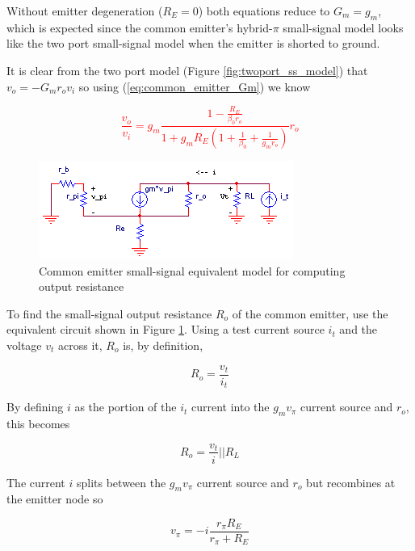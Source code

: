 \noindent Without emitter degeneration ($R_{E} = 0$) both equations reduce to $G_{m} = g_{m}$, which is expected since the common emitter's hybrid-$\pi$ small-signal model looks like the two port small-signal model when the emitter is shorted to ground.
\par
It is clear from the two port model (Figure \ref{fig:twoport_ss_model}) that $v_{o} = -G_{m}r_{o}v_{i}$ so using (\ref{eq:common_emitter_Gm}) we know

\textcolor{red}{
\begin{equation}
\frac{v_{o}}{v_{i}} = g_{m}\frac{1-\frac{R_{E}}{\beta_{0}r_{o}}}{1 + g_{m}R_{E}\left(1 + \frac{1}{\beta_{0}} + \frac{1}{g_{m}r_{o}}\right)}r_{o}
\label{eq:commonemitter_transferfunction}
\end{equation}
}

\begin{figure}
	\centering
		\includegraphics{schematics/commonemitter_Ro.PNG}
	\caption{Common emitter small-signal equivalent model for computing output resistance}
	\label{fig:commonemitter_Ro}
\end{figure}
\par
To find the small-signal output resistance $R_{o}$ of the common emitter, use the equivalent circuit shown in Figure \ref{fig:commonemitter_Ro}. Using a test current source $i_{t}$ and the voltage $v_{t}$ across it, $R_{o}$ is, by definition,

\begin{equation}
R_{o} = \frac{v_{t}}{i_{t}}
\end{equation}

\noindent By defining $i$ as the portion of the $i_{t}$ current into the $g_{m}v_{\pi}$ current source and $r_{o}$, this becomes

\begin{equation}
R_{o} = \frac{v_{t}}{i}||R_{L}
\end{equation}

\noindent The current $i$ splits between the $g_{m}v_{\pi}$ current source and $r_{o}$ but recombines at the emitter node so

\begin{equation}
v_{\pi} = -i\frac{r_{\pi}R_{E}}{r_{\pi}+R_{E}}
\label{eq:commonemitter_Ro_v_pi}
\end{equation}

